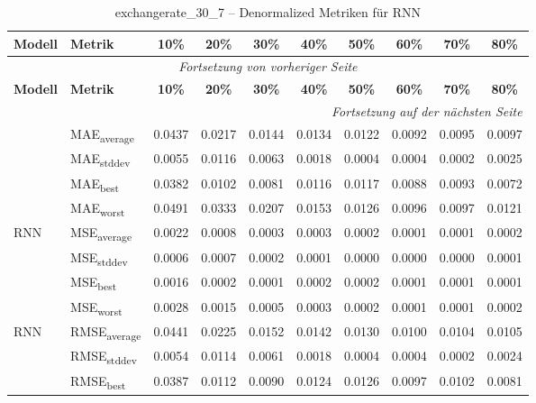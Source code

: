 {\small
\begin{longtable}{l l c c c c c c c c}
    \toprule
    \textbf{Modell} & \textbf{Metrik} & \textbf{10\%} & \textbf{20\%} & \textbf{30\%} & \textbf{40\%} & \textbf{50\%} & \textbf{60\%} & \textbf{70\%} & \textbf{80\%} \\
    \midrule
    \endfirsthead
    \multicolumn{10}{c}{\textit{Fortsetzung von vorheriger Seite}} \\
    \toprule
    \textbf{Modell} & \textbf{Metrik} & \textbf{10\%} & \textbf{20\%} & \textbf{30\%} & \textbf{40\%} & \textbf{50\%} & \textbf{60\%} & \textbf{70\%} & \textbf{80\%} \\
    \midrule
    \endhead
    \midrule
    \multicolumn{10}{r}{\textit{Fortsetzung auf der nächsten Seite}} \\
    \midrule
    \endfoot
    \bottomrule
    \caption{exchangerate_30_7 -- Denormalized Metriken für RNN}
    \label{tab:exchangerate_30_7_denormalized_rnn}
    \endlastfoot
\multirow{4}{*}{RNN} & MAE\textsubscript{average} & 0.0437 & 0.0217 & 0.0144 & 0.0134 & 0.0122 & 0.0092 & 0.0095 & 0.0097 \\
 & MAE\textsubscript{stddev} & 0.0055 & 0.0116 & 0.0063 & 0.0018 & 0.0004 & 0.0004 & 0.0002 & 0.0025 \\
 & MAE\textsubscript{best} & 0.0382 & 0.0102 & 0.0081 & 0.0116 & 0.0117 & 0.0088 & 0.0093 & 0.0072 \\
 & MAE\textsubscript{worst} & 0.0491 & 0.0333 & 0.0207 & 0.0153 & 0.0126 & 0.0096 & 0.0097 & 0.0121 \\
\cmidrule(lr){2-10}
\multirow{4}{*}{RNN} & MSE\textsubscript{average} & 0.0022 & 0.0008 & 0.0003 & 0.0003 & 0.0002 & 0.0001 & 0.0001 & 0.0002 \\
 & MSE\textsubscript{stddev} & 0.0006 & 0.0007 & 0.0002 & 0.0001 & 0.0000 & 0.0000 & 0.0000 & 0.0001 \\
 & MSE\textsubscript{best} & 0.0016 & 0.0002 & 0.0001 & 0.0002 & 0.0002 & 0.0001 & 0.0001 & 0.0001 \\
 & MSE\textsubscript{worst} & 0.0028 & 0.0015 & 0.0005 & 0.0003 & 0.0002 & 0.0001 & 0.0001 & 0.0002 \\
\cmidrule(lr){2-10}
\multirow{4}{*}{RNN} & RMSE\textsubscript{average} & 0.0441 & 0.0225 & 0.0152 & 0.0142 & 0.0130 & 0.0100 & 0.0104 & 0.0105 \\
 & RMSE\textsubscript{stddev} & 0.0054 & 0.0114 & 0.0061 & 0.0018 & 0.0004 & 0.0004 & 0.0002 & 0.0024 \\
 & RMSE\textsubscript{best} & 0.0387 & 0.0112 & 0.0090 & 0.0124 & 0.0126 & 0.0097 & 0.0102 & 0.0081 \\

\end{longtable}}
